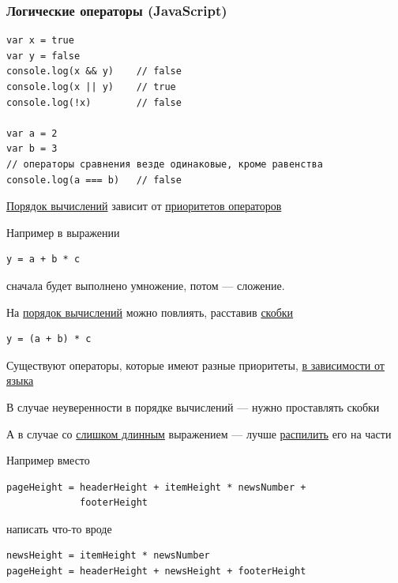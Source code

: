 {\begin{frame}[fragile]
  \frametitle{Логические операторы (JavaScript)}
  \begin{verbatim}
var x = true
var y = false
console.log(x && y)    // false
console.log(x || y)    // true
console.log(!x)        // false

var a = 2
var b = 3
// операторы сравнения везде одинаковые, кроме равенства
console.log(a === b)   // false
  \end{verbatim}
\end{frame}

\begin{frame}[fragile]
  \underline{Порядок вычислений} зависит от \underline{приоритетов операторов}

  Например в выражении
  \begin{verbatim}
y = a + b * c
  \end{verbatim}
  сначала будет выполнено умножение, потом --- сложение.
\end{frame}

\begin{frame}[fragile]
  На \underline{порядок вычислений} можно повлиять, расставив \underline{скобки}
  \begin{verbatim}
y = (a + b) * c
  \end{verbatim}

\vspace{0.5cm}
Существуют операторы, которые имеют разные приоритеты, \underline{в зависимости от языка}

\vspace{0.5cm}
В случае неуверенности в порядке вычислений --- нужно проставлять скобки
\end{frame}

\begin{frame}[fragile]
  А в случае со \underline{слишком длинным} выражением --- лучше \underline{распилить} его на части

  \vspace{0.5cm}
  Например вместо
  \begin{verbatim}
pageHeight = headerHeight + itemHeight * newsNumber +
             footerHeight
  \end{verbatim}

\vspace{0.5cm}
написать что-то вроде
  \begin{verbatim}
newsHeight = itemHeight * newsNumber
pageHeight = headerHeight + newsHeight + footerHeight
  \end{verbatim}
\end{frame}

}
